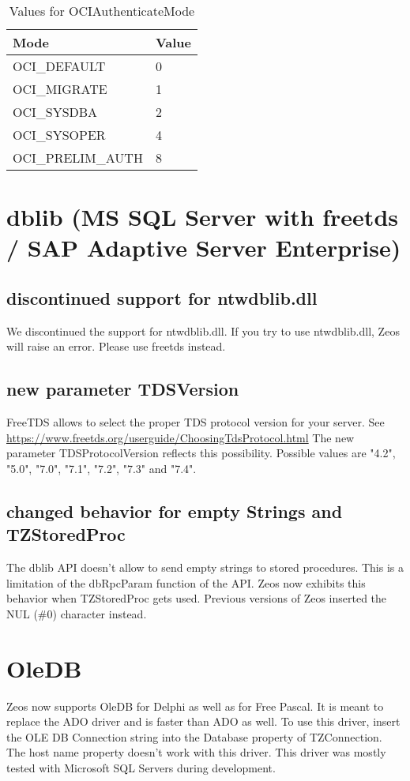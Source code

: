 \documentclass[a4paper,12pt,oneside]{article}
\begin{document}
\begin{table}
    \begin{tabular}{ ll }
	  Mode & Value \\ \hline
    OCI\_DEFAULT & 0 \\
    OCI\_MIGRATE & 1 \\
    OCI\_SYSDBA & 2 \\
    OCI\_SYSOPER & 4 \\
    OCI\_PRELIM\_AUTH & 8 \\
	  \end{tabular}
    \caption{Values for OCIAuthenticateMode}
    \label{tbl:OCIAuthenticateModeValues}
\end{table}

\FloatBarrier
\section{dblib (MS SQL Server with freetds / SAP Adaptive Server Enterprise)}

\subsection{discontinued support for ntwdblib.dll}
We discontinued the support for ntwdblib.dll.
If you try to use ntwdblib.dll, Zeos will raise an error.
Please use freetds instead.

\subsection{new parameter TDSVersion}
FreeTDS allows to select the proper TDS protocol version for your server.
See \url{https://www.freetds.org/userguide/ChoosingTdsProtocol.html}
The new parameter TDSProtocolVersion reflects this possibility.
Possible values are "4.2", "5.0", "7.0", "7.1", "7.2", "7.3" and "7.4".

\subsection{changed behavior for empty Strings and TZStoredProc}
The dblib API doesn't allow to send empty strings to stored procedures.
This is a limitation of the dbRpcParam function of the API.
Zeos now exhibits this behavior when TZStoredProc gets used.
Previous versions of Zeos inserted the NUL (\#0) character instead.

\section{OleDB}
Zeos now supports OleDB for Delphi as well as for Free Pascal.
It is meant to replace the ADO driver and is faster than ADO as well.
To use this driver, insert the OLE DB Connection string into the Database property of TZConnection.
The host name property doesn't work with this driver.
This driver was mostly tested with Microsoft SQL Servers during development.
\end{document}
